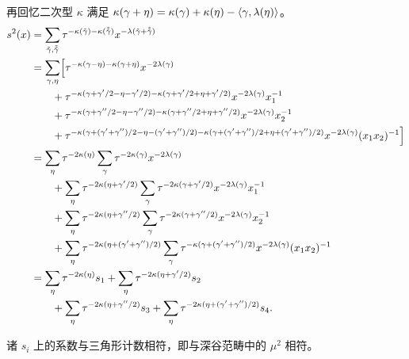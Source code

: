 再回忆二次型 $\kappa$ 满足
$\kappa(\gamma+\eta)=\kappa(\gamma)+\kappa(\eta)-\langle \gamma,\lambda(\eta)\rangle$。
\begin{align*}
s^2(x)&=\sum_{\tilde\gamma,\tilde{\tilde\gamma}}
\tau^{-\kappa(\tilde\gamma)-\kappa(\tilde{\tilde\gamma})}
x^{-\lambda(\tilde\gamma+\tilde{\tilde\gamma})}\\
&=\sum_{\gamma,\eta}\Bigl[
\tau^{-\kappa(\gamma-\eta)-\kappa(\gamma+\eta)}x^{-2\lambda(\gamma)}\\
&\qquad+\tau^{-\kappa(\gamma+\gamma'/2-\eta-\gamma'/2)
-\kappa(\gamma+\gamma'/2+\eta+\gamma'/2)}x^{-2\lambda(\gamma)}x_1^{-1}\\
&\qquad+\tau^{-\kappa(\gamma+\gamma''/2-\eta-\gamma''/2)
-\kappa(\gamma+\gamma''/2+\eta+\gamma''/2)}x^{-2\lambda(\gamma)}x_2^{-1}\\
&\qquad+\tau^{-\kappa(\gamma+(\gamma'+\gamma'')/2-\eta-(\gamma'+\gamma'')/2)
-\kappa(\gamma+(\gamma'+\gamma'')/2+\eta+(\gamma'+\gamma'')/2)}
x^{-2\lambda(\gamma)}(x_1x_2)^{-1}\Bigr]\\
&=\sum_\eta\tau^{-2\kappa(\eta)}\sum_\gamma\tau^{-2\kappa(\gamma)}x^{-2\lambda(\gamma)}\\
&\qquad+\sum_\eta\tau^{-2\kappa(\eta+\gamma'/2)}\sum_\gamma
\tau^{-2\kappa(\gamma+\gamma'/2)}x^{-2\lambda(\gamma)}x_1^{-1}\\
&\qquad+\sum_\eta\tau^{-2\kappa(\eta+\gamma''/2)}\sum_\gamma
\tau^{-2\kappa(\gamma+\gamma''/2)}x^{-2\lambda(\gamma)}x_2^{-1}\\
&\qquad+\sum_\eta\tau^{-2\kappa(\eta+(\gamma'+\gamma'')/2)}
\sum_\gamma\tau^{-\kappa(\gamma+(\gamma'+\gamma'')/2)}x^{-2\lambda(\gamma)}
(x_1x_2)^{-1}\\
&=\sum_\eta\tau^{-2\kappa(\eta)}s_1
+\sum_\eta\tau^{-2\kappa(\eta+\gamma'/2)}s_2\\
&\qquad+\sum_\eta\tau^{-2\kappa(\eta+\gamma''/2)}s_3
+\sum_\eta\tau^{-2\kappa(\eta+(\gamma'+\gamma'')/2)}s_4.
\end{align*}


\begin{claim}\label{claim:coeff-triangle}
诸 $s_i$ 上的系数与三角形计数相符，即与深谷范畴中的 $\mu^2$ 相符。
\end{claim}

